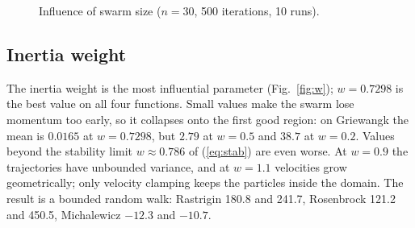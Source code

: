 \documentclass[conference]{IEEEtran}
\begin{document}
\begin{figure}[t]
\centering
{}
\caption{Influence of swarm size ($n=30$, 500 iterations, 10 runs).}
\label{fig:swarm}
\end{figure}

\subsection{Inertia weight}
The inertia weight is the most influential parameter (Fig.~\ref{fig:w});
$w=0.7298$ is the best value on all four functions. Small values make the
swarm lose momentum too early, so it collapses onto the first good region:
on Griewangk the mean is $0.0165$ at $w=0.7298$, but $2.79$ at $w=0.5$ and
$38.7$ at $w=0.2$. Values beyond the stability limit $w\approx0.786$ of
(\ref{eq:stab}) are even worse. At $w=0.9$ the trajectories have unbounded
variance, and at $w=1.1$ velocities grow geometrically; only velocity
clamping keeps the particles inside the domain. The result is a bounded
random walk: Rastrigin 180.8 and 241.7, Rosenbrock 121.2 and 450.5,
Michalewicz $-12.3$ and $-10.7$.
\end{document}
